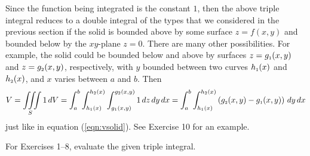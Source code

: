 Since the function being integrated is the constant $1$, then the above triple integral reduces to a double integral of
the types that we considered in the previous section if the solid is bounded above by some surface $z=f(x,y)$ and
bounded below by the $xy$-plane $z=0$. There are many other possibilities. For example, the solid could be bounded
below and above by surfaces $z=g_{\scriptscriptstyle 1}(x,y)$ and $z=g_{\scriptscriptstyle 2}(x,y)$, respectively, with $y$ bounded between
two curves $h_{\scriptscriptstyle 1}(x)$ and $h_{\scriptscriptstyle 2}(x)$, and $x$ varies between $a$ and $b$. Then
\begin{displaymath}
 V = \iiint\limits_{S} 1\,dV =
  \int_{a}^{b} \int_{h_{\scriptscriptstyle 1}(x)}^{h_{\scriptscriptstyle 2}(x)} \int_{g_{\scriptscriptstyle 1}(x,y)}^{g_{\scriptscriptstyle 2}(x,y)} 1\,dz\,dy\,dx =
  \int_{a}^{b} \int_{h_{\scriptscriptstyle 1}(x)}^{h_{\scriptscriptstyle 2}(x)} \left( g_{\scriptscriptstyle 2}(x,y) - g_{\scriptscriptstyle 1}(x,y) \right) \,dy\,dx
\end{displaymath}
just like in equation (\ref{eqn:vsolid}). See Exercise 10 for an example.
\startexercises\label{sec3dot3}
\par\noindent For Exercises 1--8, evaluate the given triple integral.
